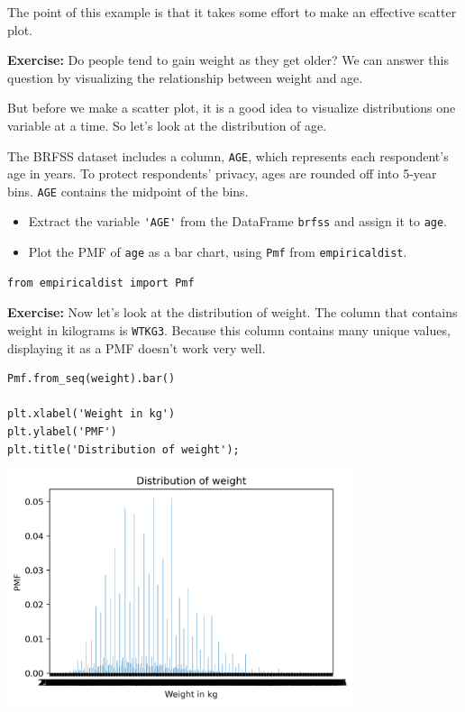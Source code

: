 The point of this example is that it takes some effort to make an
effective scatter plot.

\textbf{Exercise:} Do people tend to gain weight as they get older? We
can answer this question by visualizing the relationship between weight
and age.

But before we make a scatter plot, it is a good idea to visualize
distributions one variable at a time. So let's look at the distribution
of age.

The BRFSS dataset includes a column, \passthrough{\lstinline!AGE!},
which represents each respondent's age in years. To protect respondents'
privacy, ages are rounded off into 5-year bins.
\passthrough{\lstinline!AGE!} contains the midpoint of the bins.

\begin{itemize}
\item
  Extract the variable \passthrough{\lstinline!'AGE'!} from the
  DataFrame \passthrough{\lstinline!brfss!} and assign it to
  \passthrough{\lstinline!age!}.
\item
  Plot the PMF of \passthrough{\lstinline!age!} as a bar chart, using
  \passthrough{\lstinline!Pmf!} from
  \passthrough{\lstinline!empiricaldist!}.
\end{itemize}

\begin{lstlisting}[]
from empiricaldist import Pmf
\end{lstlisting}

\textbf{Exercise:} Now let's look at the distribution of weight. The
column that contains weight in kilograms is
\passthrough{\lstinline!WTKG3!}. Because this column contains many
unique values, displaying it as a PMF doesn't work very well.

\begin{lstlisting}[]
Pmf.from_seq(weight).bar()

plt.xlabel('Weight in kg')
plt.ylabel('PMF')
plt.title('Distribution of weight');
\end{lstlisting}

\begin{center}
\includegraphics[width=4in]{chapters/09_relationships_files/09_relationships_34_0.png}
\end{center}

